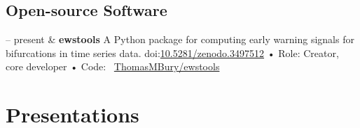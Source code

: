 \documentclass[11pt, a4paper]{article}
\newcommand{\DOI}[1]{doi:\href{https://doi.org/#1}{#1}}
\newcommand{\GitHub}[1]{\newline • Code: \faGithub\ \href{https://github.com/#1}{#1}}
\newcommand{\Role}[1]{\newline • Role: #1}
\newcommand{\Website}[1]{\newline • Website: \href{https://#1}{#1}}
\newcommand{\Duration}[2]{\fontsize{10pt}{0}\selectfont #1 -- #2}
\newcommand{\Ongoing}{present}
\begin{document}
%

%



\subsection{Open-source Software}

\begin{EntriesTable}
  \Duration{2019}{\Ongoing} &
  \textbf{ewstools}
  \newline
  A Python package for computing early warning signals for bifurcations in time series data.
  \DOI{10.5281/zenodo.3497512}
  \Role{Creator, core developer}
  \GitHub{ThomasMBury/ewstools}
\end{EntriesTable}



\section{Presentations}
\end{document}
